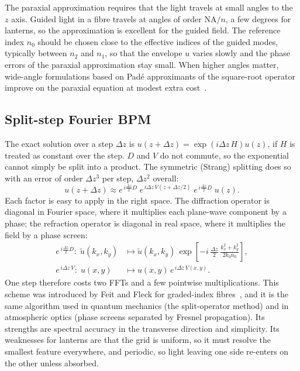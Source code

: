 \documentclass[11pt,a4paper]{article}
\begin{document}
The paraxial approximation requires that the light travels at small angles to the $z$ axis. Guided light in a fibre travels at angles of order $\mathrm{NA}/n$, a few degrees for lanterns, so the approximation is excellent for the guided field. The reference index $n_0$ should be chosen close to the effective indices of the guided modes, typically between $n_2$ and $n_1$, so that the envelope $u$ varies slowly and the phase errors of the paraxial approximation stay small. When higher angles matter, wide-angle formulations based on Pad\'e approximants of the square-root operator improve on the paraxial equation at modest extra cost~\cite{Hadley1992}.

\subsection{Split-step Fourier BPM}
The exact solution over a step $\Delta z$ is $u(z + \Delta z) = \exp(i\Delta z\,H)u(z)$, if $H$ is treated as constant over the step. $D$ and $V$ do not commute, so the exponential cannot simply be split into a product. The symmetric (Strang) splitting does so with an error of order $\Delta z^3$ per step, $\Delta z^2$ overall:
\begin{equation}
u(z + \Delta z) \approx e^{\,i\frac{\Delta z}{2}D}\;
e^{\,i\Delta z\, V(z + \Delta z/2)}\;
e^{\,i\frac{\Delta z}{2}D}\; u(z).
\label{eq:strang}
\end{equation}
Each factor is easy to apply in the right space. The diffraction operator is diagonal in Fourier space, where it multiplies each plane-wave component by a phase; the refraction operator is diagonal in real space, where it multiplies the field by a phase screen:
\begin{align}
e^{\,i\frac{\Delta z}{2}D}:\;
\tilde{u}(k_x,k_y) &\mapsto \tilde{u}(k_x,k_y)\,
\exp\!\left[-i\,\frac{\Delta z}{2}\,
\frac{k_x^2 + k_y^2}{2 k_0 n_0}\right],
\label{eq:diffraction_step}\\
e^{\,i\Delta z\, V}:\;
u(x,y) &\mapsto u(x,y)\, e^{\,i\Delta z\, V(x,y)}.
\label{eq:refraction_step}
\end{align}
One step therefore costs two FFTs and a few pointwise multiplications. This scheme was introduced by Feit and Fleck for graded-index fibres~\cite{FeitFleck1978}, and it is the same algorithm used in quantum mechanics (the split-operator method) and in atmospheric optics (phase screens separated by Fresnel propagation). Its strengths are spectral accuracy in the transverse direction and simplicity. Its weaknesses for lanterns are that the grid is uniform, so it must resolve the smallest feature everywhere, and periodic, so light leaving one side re-enters on the other unless absorbed.
\end{document}
